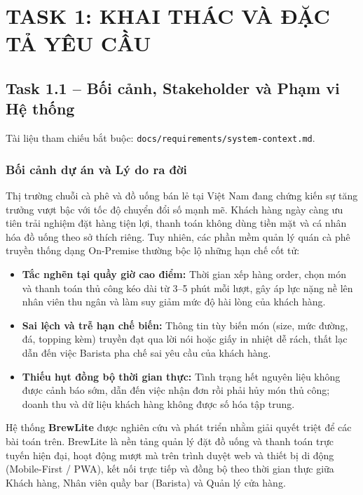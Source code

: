 \documentclass[11pt,a4paper]{article}
\begin{document}
\clearpage
\tableofcontents
\clearpage

\section{TASK 1: KHAI THÁC VÀ ĐẶC TẢ YÊU CẦU}

\subsection{Task 1.1 -- Bối cảnh, Stakeholder và Phạm vi Hệ thống}

Tài liệu tham chiếu bắt buộc: \texttt{docs/requirements/system-context.md}.

\subsubsection{Bối cảnh dự án và Lý do ra đời}
Thị trường chuỗi cà phê và đồ uống bán lẻ tại Việt Nam đang chứng kiến sự tăng trưởng vượt bậc với tốc độ chuyển đổi số mạnh mẽ. Khách hàng ngày càng ưu tiên trải nghiệm đặt hàng tiện lợi, thanh toán không dùng tiền mặt và cá nhân hóa đồ uống theo sở thích riêng. Tuy nhiên, các phần mềm quản lý quán cà phê truyền thống dạng On-Premise thường bộc lộ những hạn chế cốt tử:
\begin{itemize}[leftmargin=*]
    \item \textbf{Tắc nghẽn tại quầy giờ cao điểm:} Thời gian xếp hàng order, chọn món và thanh toán thủ công kéo dài từ 3--5 phút mỗi lượt, gây áp lực nặng nề lên nhân viên thu ngân và làm suy giảm mức độ hài lòng của khách hàng.
    \item \textbf{Sai lệch và trễ hạn chế biến:} Thông tin tùy biến món (size, mức đường, đá, topping kèm) truyền đạt qua lời nói hoặc giấy in nhiệt dễ rách, thất lạc dẫn đến việc Barista pha chế sai yêu cầu của khách hàng.
    \item \textbf{Thiếu hụt đồng bộ thời gian thực:} Tình trạng hết nguyên liệu không được cảnh báo sớm, dẫn đến việc nhận đơn rồi phải hủy món thủ công; doanh thu và dữ liệu khách hàng không được số hóa tập trung.
\end{itemize}

Hệ thống \textbf{BrewLite} được nghiên cứu và phát triển nhằm giải quyết triệt để các bài toán trên. BrewLite là nền tảng quản lý đặt đồ uống và thanh toán trực tuyến hiện đại, hoạt động mượt mà trên trình duyệt web và thiết bị di động (Mobile-First / PWA), kết nối trực tiếp và đồng bộ theo thời gian thực giữa Khách hàng, Nhân viên quầy bar (Barista) và Quản lý cửa hàng.
\clearpage
\end{document}
